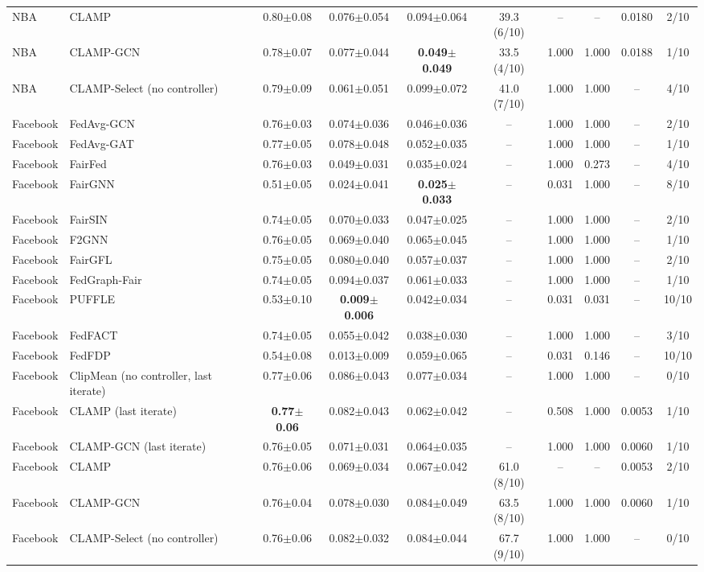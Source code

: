 \begin{table}[tbp]
{\begin{tabular}{llcccccccc}
NBA & CLAMP & 0.80$\pm$0.08 & 0.076$\pm$0.054 & 0.094$\pm$0.064 & 39.3 (6/10) & -- & -- & 0.0180 & 2/10 \\
NBA & CLAMP-GCN & 0.78$\pm$0.07 & 0.077$\pm$0.044 & \textbf{0.049$\pm$0.049} & 33.5 (4/10) & 1.000 & 1.000 & 0.0188 & 1/10 \\
NBA & CLAMP-Select (no controller) & 0.79$\pm$0.09 & 0.061$\pm$0.051 & 0.099$\pm$0.072 & 41.0 (7/10) & 1.000 & 1.000 & -- & 4/10 \\
Facebook & FedAvg-GCN & 0.76$\pm$0.03 & 0.074$\pm$0.036 & 0.046$\pm$0.036 & -- & 1.000 & 1.000 & -- & 2/10 \\
Facebook & FedAvg-GAT & 0.77$\pm$0.05 & 0.078$\pm$0.048 & 0.052$\pm$0.035 & -- & 1.000 & 1.000 & -- & 1/10 \\
Facebook & FairFed & 0.76$\pm$0.03 & 0.049$\pm$0.031 & 0.035$\pm$0.024 & -- & 1.000 & 0.273 & -- & 4/10 \\
Facebook & FairGNN & 0.51$\pm$0.05 & 0.024$\pm$0.041 & \textbf{0.025$\pm$0.033} & -- & 0.031 & 1.000 & -- & 8/10 \\
Facebook & FairSIN & 0.74$\pm$0.05 & 0.070$\pm$0.033 & 0.047$\pm$0.025 & -- & 1.000 & 1.000 & -- & 2/10 \\
Facebook & F2GNN & 0.76$\pm$0.05 & 0.069$\pm$0.040 & 0.065$\pm$0.045 & -- & 1.000 & 1.000 & -- & 1/10 \\
Facebook & FairGFL & 0.75$\pm$0.05 & 0.080$\pm$0.040 & 0.057$\pm$0.037 & -- & 1.000 & 1.000 & -- & 2/10 \\
Facebook & FedGraph-Fair & 0.74$\pm$0.05 & 0.094$\pm$0.037 & 0.061$\pm$0.033 & -- & 1.000 & 1.000 & -- & 1/10 \\
Facebook & PUFFLE & 0.53$\pm$0.10 & \textbf{0.009$\pm$0.006} & 0.042$\pm$0.034 & -- & 0.031 & 0.031 & -- & 10/10 \\
Facebook & FedFACT & 0.74$\pm$0.05 & 0.055$\pm$0.042 & 0.038$\pm$0.030 & -- & 1.000 & 1.000 & -- & 3/10 \\
Facebook & FedFDP & 0.54$\pm$0.08 & 0.013$\pm$0.009 & 0.059$\pm$0.065 & -- & 0.031 & 0.146 & -- & 10/10 \\
Facebook & ClipMean (no controller, last iterate) & 0.77$\pm$0.06 & 0.086$\pm$0.043 & 0.077$\pm$0.034 & -- & 1.000 & 1.000 & -- & 0/10 \\
Facebook & CLAMP (last iterate) & \textbf{0.77$\pm$0.06} & 0.082$\pm$0.043 & 0.062$\pm$0.042 & -- & 0.508 & 1.000 & 0.0053 & 1/10 \\
Facebook & CLAMP-GCN (last iterate) & 0.76$\pm$0.05 & 0.071$\pm$0.031 & 0.064$\pm$0.035 & -- & 1.000 & 1.000 & 0.0060 & 1/10 \\
Facebook & CLAMP & 0.76$\pm$0.06 & 0.069$\pm$0.034 & 0.067$\pm$0.042 & 61.0 (8/10) & -- & -- & 0.0053 & 2/10 \\
Facebook & CLAMP-GCN & 0.76$\pm$0.04 & 0.078$\pm$0.030 & 0.084$\pm$0.049 & 63.5 (8/10) & 1.000 & 1.000 & 0.0060 & 1/10 \\
Facebook & CLAMP-Select (no controller) & 0.76$\pm$0.06 & 0.082$\pm$0.032 & 0.084$\pm$0.044 & 67.7 (9/10) & 1.000 & 1.000 & -- & 0/10 \\
\bottomrule
\end{tabular}
}
\end{table}
